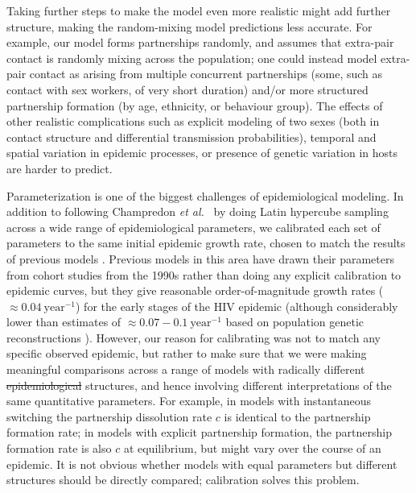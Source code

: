 \documentclass[10pt,letterpaper]{article}
\newcommand{\etal}{\textit{et al.}}
\providecommand{\DIFaddtex}[1]{{\protect\color{blue}\uwave{#1}}} %
\providecommand{\DIFdeltex}[1]{{\protect\color{red}\sout{#1}}}                      %
\providecommand{\DIFaddbegin}{} %
\providecommand{\DIFaddend}{} %
\providecommand{\DIFdelbegin}{} %
\providecommand{\DIFdelend}{} %
\providecommand{\DIFadd}[1]{\texorpdfstring{\DIFaddtex{#1}}{#1}} %
\providecommand{\DIFdel}[1]{\texorpdfstring{\DIFdeltex{#1}}{}} %
\newcommand{\DIFscaledelfig}{0.5}
\newlength{\DIFdelgraphicswidth} %
\newlength{\DIFdelgraphicsheight} %
\newcommand{\DIFaddincludegraphics}[2][]{{\color{blue}\fbox{\DIFOincludegraphics[#1]{#2}}}} %
\newcommand{\DIFdelincludegraphics}[2][]{%
\sbox{\DIFdelgraphicsbox}{\DIFOincludegraphics[#1]{#2}}%
\settoboxwidth{\DIFdelgraphicswidth}{\DIFdelgraphicsbox} %
\settoboxtotalheight{\DIFdelgraphicsheight}{\DIFdelgraphicsbox} %
\scalebox{\DIFscaledelfig}{%
\parbox[b]{\DIFdelgraphicswidth}{\usebox{\DIFdelgraphicsbox}\\[-\baselineskip] \rule{\DIFdelgraphicswidth}{0em}}\llap{\resizebox{\DIFdelgraphicswidth}{\DIFdelgraphicsheight}{%
\setlength{\unitlength}{\DIFdelgraphicswidth}%
\begin{picture}(1,1)%
\thicklines\linethickness{2pt} %
{\color[rgb]{1,0,0}\put(0,0){\framebox(1,1){}}}%
{\color[rgb]{1,0,0}\put(0,0){\line( 1,1){1}}}%
{\color[rgb]{1,0,0}\put(0,1){\line(1,-1){1}}}%
\end{picture}%
}\hspace*{3pt}}} %
} %
\DeclareRobustCommand{\DIFaddbegin}{\DIFOaddbegin \let\includegraphics\DIFaddincludegraphics} %
\DeclareRobustCommand{\DIFaddend}{\DIFOaddend \let\includegraphics\DIFOincludegraphics} %
\DeclareRobustCommand{\DIFdelbegin}{\DIFOdelbegin \let\includegraphics\DIFdelincludegraphics} %
\DeclareRobustCommand{\DIFdelend}{\DIFOaddend \let\includegraphics\DIFOincludegraphics} %
\begin{document}
Taking further steps to make the model even more realistic
might add further structure,
making the random-mixing model predictions less accurate. For
example, our model forms partnerships randomly, and assumes that
extra-pair contact is randomly mixing across the population;
one could instead model extra-pair contact as arising from
multiple concurrent partnerships (some, such as contact with sex
workers, of very short duration) and/or more structured partnership
formation (by age, ethnicity, or behaviour group). The effects of
other realistic complications such as explicit modeling of two
sexes (both in contact structure and differential transmission
probabilities), temporal and spatial variation in epidemic processes,
or presence of genetic variation in hosts are harder to predict.

Parameterization is one of the biggest challenges of epidemiological
modeling. In addition to following Champredon \etal\ \cite{champredon_hiv_2013} 
by doing Latin hypercube
sampling across a wide range of epidemiological parameters, we 
calibrated each set of parameters to the same initial epidemic
growth rate, chosen to match the results of previous models
\cite{shirreff_transmission_2011}.  Previous models 
in this area have drawn their
parameters from cohort studies from the 1990s
\cite{wawer2005rates,hollingsworth_hiv1_2008}
rather than doing any explicit calibration to epidemic curves,
but they give reasonable order-of-magnitude
growth rates ($\approx 0.04~\textrm{year}^{-1}$)
for the early stages of the HIV epidemic (although considerably
lower than estimates of $\approx 0.07-0.1~\textrm{year}^{-1}$
based on population genetic reconstructions \cite{faria_early_2014}).
However, our reason for calibrating was not to match any
specific observed epidemic, but rather to make sure that
we were making meaningful comparisons across a range of
models with radically different \DIFdelbegin \DIFdel{epidemiological }\DIFdelend \DIFaddbegin \DIFadd{contact }\DIFaddend structures, and
hence involving different interpretations of the same quantitative
parameters.  For example, in models with instantaneous switching the
partnership dissolution rate $c$ is identical to the partnership
formation rate; in models with explicit partnership formation,
the partnership formation rate is also $c$ at equilibrium,
but might vary over the course of an epidemic.
It is not obvious whether models with equal parameters but
different structures should be directly compared; calibration
solves this problem.
\end{document}

